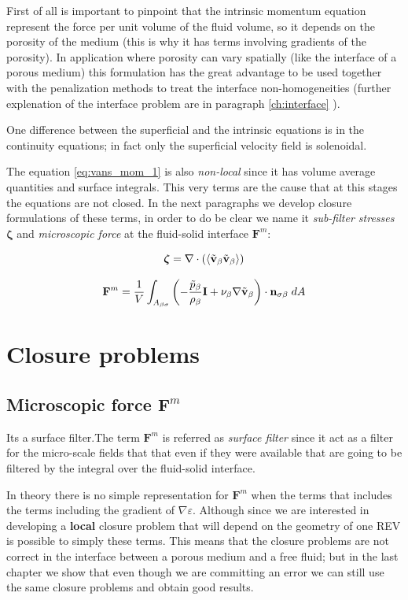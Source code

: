 First of all is important to pinpoint that the intrinsic momentum equation represent the force per unit volume of the fluid volume, so it depends on the porosity of the medium (this is why it has terms involving gradients of the porosity).
In application where porosity can vary spatially (like the interface of a porous medium) this formulation has the great advantage to be used together with the penalization methods to treat the interface non-homogeneities (further explenation of the interface problem are in paragraph \ref{ch:interface}  ).

One difference between the superficial and the intrinsic equations is in the continuity equations; in fact only the superficial velocity field is solenoidal.

The equation \eqref{eq:vans_mom_1} is also \textit{non-local} since it has volume average quantities and surface integrals.
This very terms are the cause that at this stages the equations are not closed.
In the next paragraphs we develop closure formulations of these terms, in order to do be clear we name it \textit{sub-filter stresses} $\boldsymbol{\zeta}$ and \textit{microscopic force} at the fluid-solid interface $\mathbf{F}^m$:

$$
\boldsymbol{\zeta} = \nabla \cdot \left({\left< \tilde{\textbf{v}}_{\beta} \tilde{\textbf{v}}_{\beta} \right>}\right)
$$

$$
\mathbf{F}^m =  \dfrac{1}{V} \int_{A_{\beta \sigma}} \left(-\dfrac{\tilde{p}_{\beta}}{\rho_{\beta}} \mathbf{I}  + \nu_{\beta} \nabla \tilde{\textbf{v}}_{\beta} \right)\cdot \mathbf{n}_{\sigma \beta} \;dA
$$



\section{Closure problems}


\subsection{Microscopic force $\mathbf{F}^m$}
Its a surface filter.The term $\mathbf{F}^m$ is referred as \textit{surface filter} since it act as a filter for the micro-scale fields that that even if they were available that are going to be filtered by the integral over the fluid-solid interface.

In theory there is no simple representation for $\mathbf{F}^m$ when the terms that includes the terms including the gradient of $\nabla \varepsilon$.
Although since we are interested in developing a \textbf{local} closure problem that will depend on the geometry of one REV is possible to simply these terms.
This means that the closure problems are not correct in the interface between a porous medium and a free fluid; but in the last chapter we show that even though we are committing an error we can still use the same closure problems and obtain good results.

